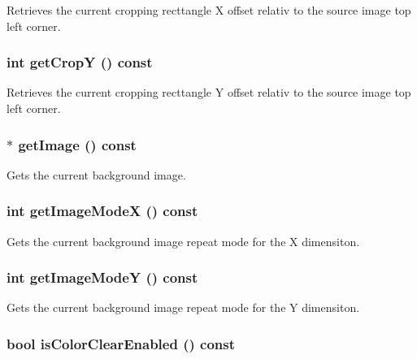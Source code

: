 Retrieves the current cropping recttangle X offset relativ to the source image top left corner. \hypertarget{classm3g_1_1Background_9ef03b219415a1f08aef6745ad5d87d0}{
\subsubsection[{getCropY}]{\setlength{\rightskip}{0pt plus 5cm}int getCropY () const}}
\label{classm3g_1_1Background_9ef03b219415a1f08aef6745ad5d87d0}


Retrieves the current cropping recttangle Y offset relativ to the source image top left corner. \hypertarget{classm3g_1_1Background_a8c0193b0e7d47d4b5c9f60df24c44f5}{
\subsubsection[{getImage}]{ $\ast$ getImage () const}}
\label{classm3g_1_1Background_a8c0193b0e7d47d4b5c9f60df24c44f5}


Gets the current background image. \hypertarget{classm3g_1_1Background_0dd60d498f4d50d8808c0b3ad61bc9e8}{
\subsubsection[{getImageModeX}]{\setlength{\rightskip}{0pt plus 5cm}int getImageModeX () const}}
\label{classm3g_1_1Background_0dd60d498f4d50d8808c0b3ad61bc9e8}


Gets the current background image repeat mode for the X dimensiton. \hypertarget{classm3g_1_1Background_a8d38d66f133ae417956a5dc5f84551d}{
\subsubsection[{getImageModeY}]{\setlength{\rightskip}{0pt plus 5cm}int getImageModeY () const}}
\label{classm3g_1_1Background_a8d38d66f133ae417956a5dc5f84551d}


Gets the current background image repeat mode for the Y dimensiton. \hypertarget{classm3g_1_1Background_d6b7bfdf4225b509549e2fbb9575b509}{
\subsubsection[{isColorClearEnabled}]{\setlength{\rightskip}{0pt plus 5cm}bool isColorClearEnabled () const}}
\label{classm3g_1_1Background_d6b7bfdf4225b509549e2fbb9575b509}


